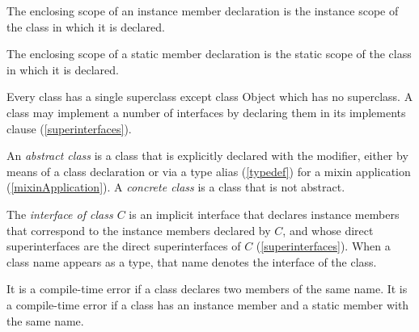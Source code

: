 \documentclass{article}
\newcommand{\code}[1]{{\sf #1}}
\begin{document}
The enclosing scope of an instance member declaration is the instance scope of the class in which it is declared.

The enclosing scope of a static member declaration is the static scope of the class in which it is declared.


\LMHash{}
Every class has a single superclass  except class \code{Object} which has no superclass. A class may implement a number of interfaces
by declaring them in its implements clause  (\ref{superinterfaces}).


\LMHash{}
An {\em abstract class} is
a class that is explicitly declared with the  \ABSTRACT{}  modifier, either by means of a class declaration or via a type alias (\ref{typedef}) for a mixin application (\ref{mixinApplication}). A {\em concrete class} is a class that is not abstract.


\LMHash{}
The {\em interface of class $C$} is an implicit interface that declares instance members that correspond to the instance members declared by $C$, and whose direct superinterfaces are the direct superinterfaces of $C$ (\ref{superinterfaces}). When a class name appears as a type, that name denotes the interface of the class.


\LMHash{}
 It is a compile-time error if a class declares two members of the same name.
It is a compile-time error if a class has an instance member and a static member  with the same name.
\end{document}

